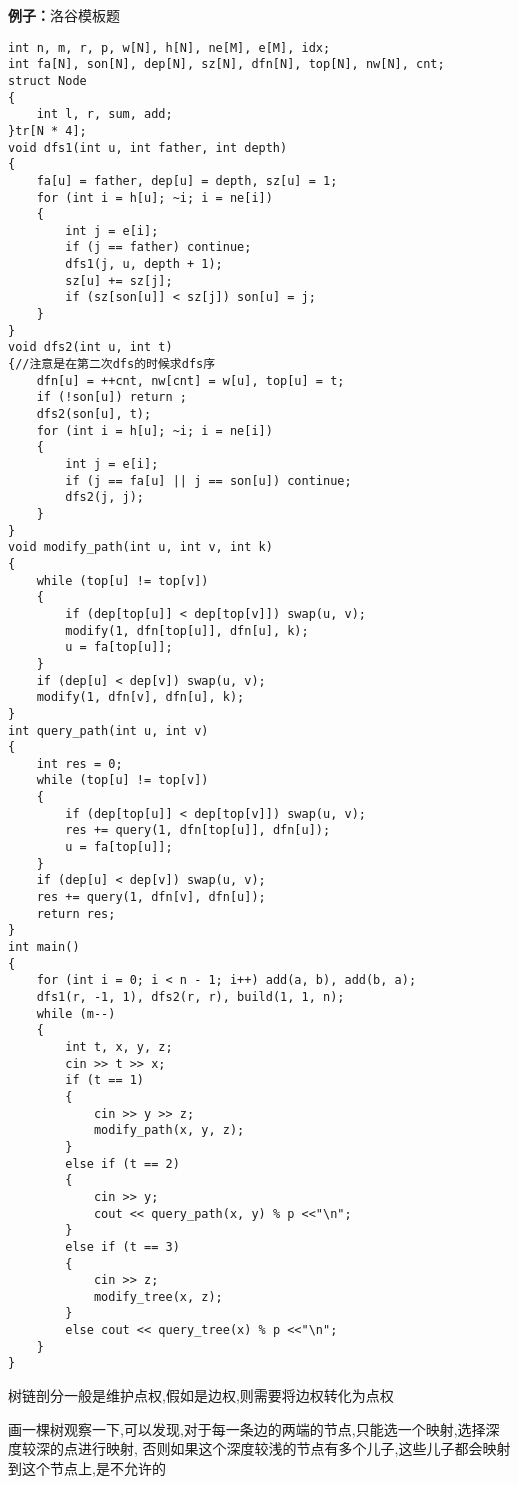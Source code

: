 \documentclass[a4paper, fontset=none]{ctexart}
\begin{document}
\textbf{例子：}洛谷模板题

\begin{verbatim}
int n, m, r, p, w[N], h[N], ne[M], e[M], idx;
int fa[N], son[N], dep[N], sz[N], dfn[N], top[N], nw[N], cnt;
struct Node
{
    int l, r, sum, add;
}tr[N * 4];
void dfs1(int u, int father, int depth)
{
    fa[u] = father, dep[u] = depth, sz[u] = 1;
    for (int i = h[u]; ~i; i = ne[i])
    {
        int j = e[i];
        if (j == father) continue;
        dfs1(j, u, depth + 1);
        sz[u] += sz[j];
        if (sz[son[u]] < sz[j]) son[u] = j;
    }
}
void dfs2(int u, int t)
{//注意是在第二次dfs的时候求dfs序
    dfn[u] = ++cnt, nw[cnt] = w[u], top[u] = t;
    if (!son[u]) return ;
    dfs2(son[u], t);
    for (int i = h[u]; ~i; i = ne[i])
    {
        int j = e[i];
        if (j == fa[u] || j == son[u]) continue;
        dfs2(j, j);
    }
}
void modify_path(int u, int v, int k)
{
    while (top[u] != top[v])
    {
        if (dep[top[u]] < dep[top[v]]) swap(u, v);
        modify(1, dfn[top[u]], dfn[u], k);
        u = fa[top[u]];
    }
    if (dep[u] < dep[v]) swap(u, v);
    modify(1, dfn[v], dfn[u], k);
}
int query_path(int u, int v)
{
    int res = 0;
    while (top[u] != top[v])
    {
        if (dep[top[u]] < dep[top[v]]) swap(u, v);
        res += query(1, dfn[top[u]], dfn[u]);
        u = fa[top[u]];
    }
    if (dep[u] < dep[v]) swap(u, v);
    res += query(1, dfn[v], dfn[u]);
    return res;
}
int main()
{
    for (int i = 0; i < n - 1; i++) add(a, b), add(b, a);
    dfs1(r, -1, 1), dfs2(r, r), build(1, 1, n);
    while (m--)
    {
        int t, x, y, z;
        cin >> t >> x;
        if (t == 1)
        {
            cin >> y >> z;
            modify_path(x, y, z);
        }
        else if (t == 2)
        {
            cin >> y;
            cout << query_path(x, y) % p <<"\n";
        }
        else if (t == 3)
        {
            cin >> z;
            modify_tree(x, z);
        }
        else cout << query_tree(x) % p <<"\n";
    }
}
\end{verbatim}

树链剖分一般是维护点权,假如是边权,则需要将边权转化为点权

画一棵树观察一下,可以发现,对于每一条边的两端的节点,只能选一个映射,选择深度较深的点进行映射,
否则如果这个深度较浅的节点有多个儿子,这些儿子都会映射到这个节点上,是不允许的
\end{document}
